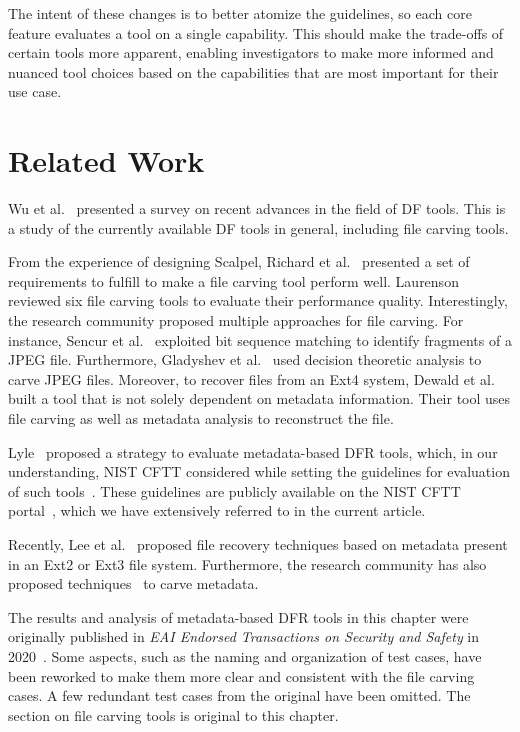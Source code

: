The intent of these changes is to better atomize the guidelines, so each core feature evaluates a tool on a single capability.
This should make the trade-offs of certain tools more apparent, enabling investigators to make more informed and nuanced tool choices based on the capabilities that are most important for their use case.

\section{Related Work}

Wu et al.~\cite{wu2020digital} presented a survey on recent advances in the field of DF tools. 
This is a study of the currently available DF tools in general, including file carving tools.

From the experience of designing Scalpel, Richard et al.~\cite{richard2005scalpel} presented 
a set of requirements to fulfill to make a file carving tool perform well. 
Laurenson~\cite{laurenson2013performance} reviewed six file carving tools to evaluate their performance quality.
Interestingly, the research community proposed multiple approaches for file carving. 
For instance, Sencur et al.~\cite{sencar2009identification} exploited bit sequence 
matching to identify fragments of a JPEG file. Furthermore, Gladyshev 
et al.~\cite{gladyshev2017decision} used decision theoretic analysis to carve JPEG files.
Moreover, to recover files from an Ext4 system, Dewald et al.~\cite{dewald2017afeic} built a tool 
that is not solely dependent on metadata information. Their tool uses 
file carving as well as metadata analysis to reconstruct the file.

Lyle~\cite{lyle2011-ICDF2C} proposed a strategy to evaluate metadata-based DFR tools, 
which, in our understanding, NIST CFTT considered while setting the guidelines 
for evaluation of such tools~\cite{meta:dfr:standards}. These guidelines are 
publicly available on the NIST CFTT portal~\cite{cftt:nist}, which we have 
extensively referred to in the current article.

Recently, Lee et al.~\cite{lee2014improved,lee2019extsfr} proposed file recovery techniques based on 
metadata present in an Ext2 or Ext3 file system. Furthermore, the research community has also 
proposed techniques~\cite{nordvik2020generic,atwal2019shining} to carve metadata.

The results and analysis of metadata-based DFR tools in this chapter were originally published in \emph{EAI Endorsed Transactions on Security and Safety} in 2020~\cite{eai}.
Some aspects, such as the naming and organization of test cases, have been reworked to make them more clear and consistent with the file carving cases.
A few redundant test cases from the original have been omitted.
The section on file carving tools is original to this chapter.


